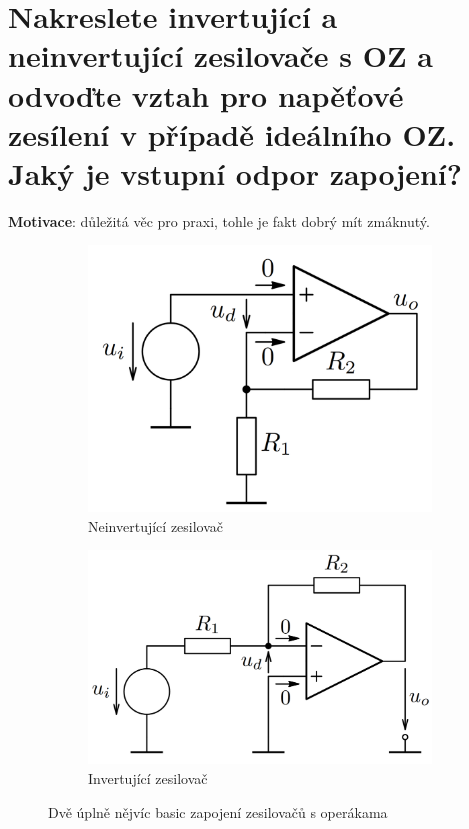 \documentclass[a4paper,12pt]{article}   %
\begin{document}
\section{Nakreslete invertující a neinvertující zesilovače s OZ a odvoďte vztah pro napěťové zesílení v případě ideálního OZ. Jaký je vstupní odpor zapojení?}
\textbf{Motivace}: důležitá věc pro praxi, tohle je fakt dobrý mít zmáknutý.
\begin{figure}[h!]
    \centering
    \begin{subfigure}{.5\textwidth}
        \centering
        \includegraphics[height=.6\linewidth]{opamp-noninvert.PNG}
        \caption{Neinvertující zesilovač}
    \end{subfigure}%
    \begin{subfigure}{.5\textwidth}
        \centering
        \includegraphics[height=.6\linewidth]{opamp-invert.PNG}
        \caption{Invertující zesilovač}
    \end{subfigure}
    \caption{Dvě úplně nějvíc basic zapojení zesilovačů s operákama}
    \label{fig:operaky}
\end{figure}
\end{document}
